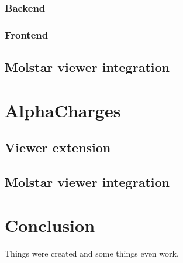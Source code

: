 \documentclass[
  digital,     %
  oneside,     %
  nosansbold,  %
  nocolorbold, %
  lof,         %
  lot,         %
]{fithesis4}
\begin{document}
\subsection{Backend}

\subsection{Frontend}

\section{Molstar viewer integration}

\chapter{AlphaCharges}

\section{Viewer extension}

\section{Molstar viewer integration}

\chapter*{Conclusion}

Things were created and some things even work.

\printbibliography[heading=bibintoc]
\end{document}
